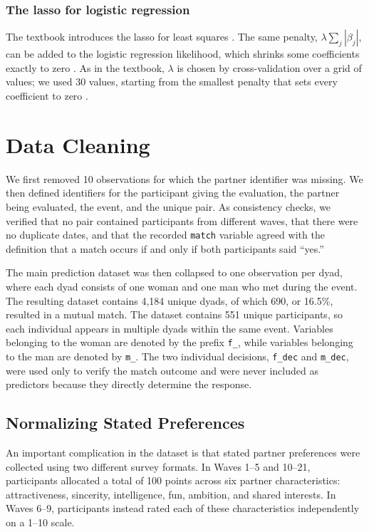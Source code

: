 \documentclass[11pt,letterpaper,reqno]{amsart}
\numberwithin{equation}{subsection}
\theoremstyle{definition}
\numberwithin{thm}{subsection}
\begin{document}
\subsubsection{The lasso for logistic regression}
The textbook introduces the lasso for least squares \cite[Section 6.2.2, pp.~244--252]{James:2023}. The same penalty,
$\lambda\sum_j|\beta_j|$, can be added to the logistic regression likelihood, which shrinks some coefficients exactly to
zero \cite[Section 4.4.4, Eq.~(4.31), p.~125]{Hastie:2009}. As in the textbook, $\lambda$ is chosen by cross-validation over a
grid of values; we used 30 values, starting from the smallest penalty that sets every coefficient to zero
\cite[Section 2.5, p.~7]{Friedman:2010}.





\section{Data Cleaning}

We first removed 10 observations for which the partner identifier was missing. We then defined identifiers for the participant giving the evaluation, the partner being evaluated, the event, and the unique pair. As consistency checks, we verified that no pair contained participants from different waves, that there were no duplicate dates, and that the recorded \texttt{match} variable agreed with the definition that a match occurs if and only if both participants said ``yes.''

The main prediction dataset was then collapsed to one observation per dyad, where each dyad consists of one woman and one man who met during the event. The resulting dataset contains 4,184 unique dyads, of which 690, or 16.5\%, resulted in a mutual match. The dataset contains 551 unique participants, so each individual appears in multiple dyads within the same event. Variables belonging to the woman are denoted by the prefix \texttt{f\_}, while variables belonging to the man are denoted by \texttt{m\_}. The two individual decisions, \texttt{f\_dec} and \texttt{m\_dec}, were used only to verify the match outcome and were never included as predictors because they directly determine the response.

\subsection{Normalizing Stated Preferences}

An important complication in the dataset is that stated partner preferences were collected using two different survey formats. In Waves 1--5 and 10--21, participants allocated a total of 100 points across six partner characteristics: attractiveness, sincerity, intelligence, fun, ambition, and shared interests. In Waves 6--9, participants instead rated each of these characteristics independently on a 1--10 scale.
\end{document}
